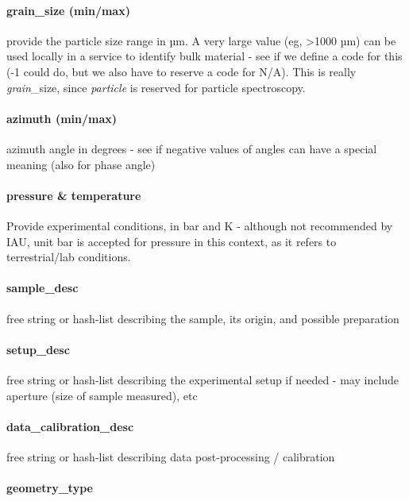 \documentclass[11pt,a4paper]{ivoa}
\begin{document}
\paragraph{grain\_size (min/max)}

provide the particle size range in µm. A very large value (eg, >1000 µm) can be used locally in a service to identify bulk material - see if we define a code for this (-1 could do, but we also have to reserve a code for N/A). This is really \emph{grain}\_size, since \emph{particle} is reserved for particle spectroscopy.\\

\paragraph{azimuth (min/max)}

azimuth angle in degrees - see if negative values of angles can have a special meaning (also for phase angle)

\paragraph{pressure \& temperature}

Provide experimental conditions, in bar and K - although not recommended by IAU, unit bar is accepted for pressure in this context, as it refers to terrestrial/lab conditions.

\paragraph{sample\_desc}

free string or hash-list describing the sample, its origin, and possible preparation

\paragraph{setup\_desc}

free string or hash-list describing the experimental setup if needed - may include aperture (size of sample measured), etc

\paragraph{data\_calibration\_desc}

free string or hash-list describing data post-processing / calibration

\paragraph{geometry\_type}
\end{document}
